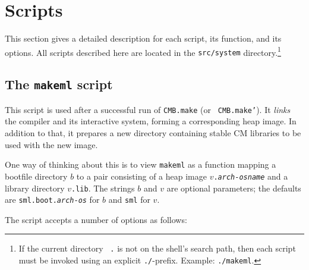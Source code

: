 %

\section{Scripts}

This section gives a detailed description for each script, its
function, and its options.  All scripts described here are located in
the {\tt src/system} directory.\footnote{If the current directory {\tt
.} is not on the shell's search path, then each script must be invoked
using an explicit {\tt ./}-prefix.  Example: {\tt ./makeml}.}

\subsection{The {\tt makeml} script}
\label{script:makeml}

This script is used after a successful run of {\tt CMB.make} (or {\tt
CMB.make'}).  It {\em links} the compiler and its interactive system,
forming a corresponding heap image.  In addition to that, it prepares
a new directory containing stable CM libraries to be used with the new
image.

One way of thinking about this is to view {\tt makeml} as a function
mapping a bootfile directory $b$ to a
pair consisting of a heap image {\tt $v$.{\it arch}-{\it osname}} and
a library directory {\tt $v$.lib}.  The strings $b$ and $v$ are
optional parameters; the defaults are {\tt sml.boot.{\it arch}-{\it os}}
for $b$ and {\tt sml} for $v$.

The script accepts a number of options as follows:

